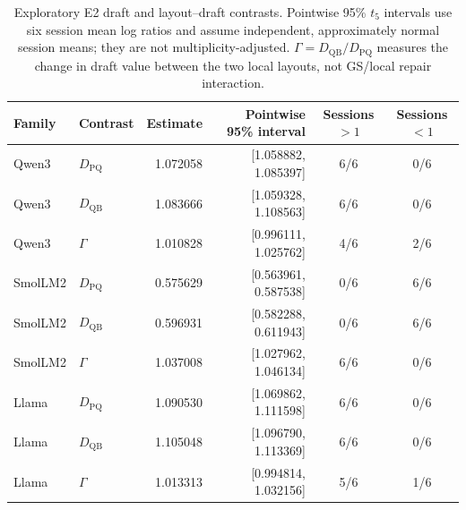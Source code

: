\begin{table}[t]\centering\small
\caption{Exploratory E2 draft and layout--draft contrasts. Pointwise 95\% $t_5$ intervals use six session mean log ratios and assume independent, approximately normal session means; they are not multiplicity-adjusted. $\Gamma=D_{\mathrm{QB}}/D_{\mathrm{PQ}}$ measures the change in draft value between the two local layouts, not GS/local repair interaction.}\label{tab:e2draftposthocdetail}
\begin{tabular}{llrrcc}\toprule
Family & Contrast & Estimate & Pointwise 95\% interval & Sessions $>1$ & Sessions $<1$\\\midrule
Qwen3 & $D_{\mathrm{PQ}}$ & 1.072058 & [1.058882, 1.085397] & 6/6 & 0/6\\
Qwen3 & $D_{\mathrm{QB}}$ & 1.083666 & [1.059328, 1.108563] & 6/6 & 0/6\\
Qwen3 & $\Gamma$ & 1.010828 & [0.996111, 1.025762] & 4/6 & 2/6\\
SmolLM2 & $D_{\mathrm{PQ}}$ & 0.575629 & [0.563961, 0.587538] & 0/6 & 6/6\\
SmolLM2 & $D_{\mathrm{QB}}$ & 0.596931 & [0.582288, 0.611943] & 0/6 & 6/6\\
SmolLM2 & $\Gamma$ & 1.037008 & [1.027962, 1.046134] & 6/6 & 0/6\\
Llama & $D_{\mathrm{PQ}}$ & 1.090530 & [1.069862, 1.111598] & 6/6 & 0/6\\
Llama & $D_{\mathrm{QB}}$ & 1.105048 & [1.096790, 1.113369] & 6/6 & 0/6\\
Llama & $\Gamma$ & 1.013313 & [0.994814, 1.032156] & 5/6 & 1/6\\
\bottomrule\end{tabular}
\end{table}

